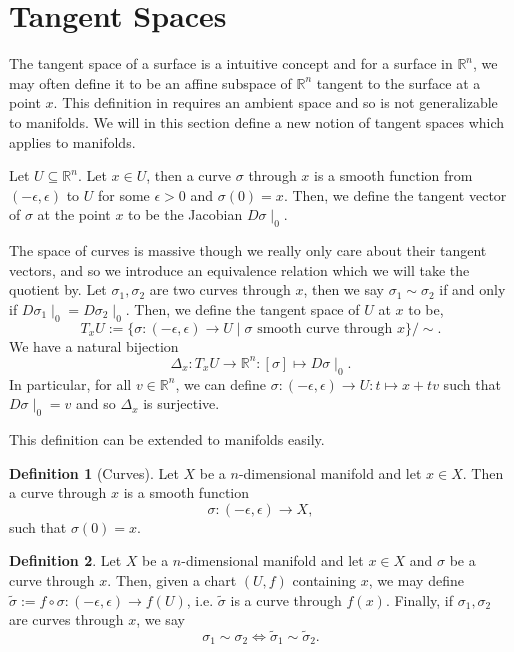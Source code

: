 \documentclass[]{article}
\theoremstyle{definition}
\theoremstyle{definition}
\newtheorem{definition}{Definition}[section]
\begin{document}
\newpage
\section{Tangent Spaces}

The tangent space of a surface is a intuitive concept and for a surface 
in \(\mathbb{R}^n\), we may often define it to be an affine subspace of 
\(\mathbb{R}^n\) tangent to the surface at a point \(x\). This definition in 
requires an ambient space and so is not generalizable to manifolds. We will 
in this section define a new notion of tangent spaces which applies to manifolds.

Let \(U \subseteq \mathbb{R}^n\). Let \(x \in U\), then a curve \(\sigma\) 
through \(x\) is a smooth function from \((-\epsilon, \epsilon)\) to \(U\) 
for some \(\epsilon > 0\) and \(\sigma(0) = x\). Then, we define the tangent 
vector of \(\sigma\) at the point \(x\) to be the Jacobian \(D\sigma\mid_0\).

The space of curves is massive though we really only care about their tangent 
vectors, and so we introduce an equivalence relation which we will take 
the quotient by. Let \(\sigma_1, \sigma_2\) are two curves through \(x\), 
then we say \(\sigma_1 \sim \sigma_2\) if and only if 
\(D\sigma_1\mid_0 = D\sigma_2 \mid_0\). Then, we define the tangent space of 
\(U\) at \(x\) to be, 
\[T_xU := \{\sigma : (-\epsilon, \epsilon) \to U \mid \sigma 
  \text{ smooth curve through } x\} / \sim.\]
We have a natural bijection 
\[\Delta_x : T_xU \to \mathbb{R}^n : [\sigma] \mapsto D\sigma\mid_0.\]
In particular, for all \(v \in \mathbb{R}^n\), we can define 
\(\sigma : (-\epsilon, \epsilon) \to U : t \mapsto x + tv\) such that 
\(D\sigma\mid_0 = v\) and so \(\Delta_x\) is surjective.

This definition can be extended to manifolds easily. 

\begin{definition}[Curves]
  Let \(X\) be a \(n\)-dimensional manifold and let \(x \in X\). Then a 
  curve through \(x\) is a smooth function 
  \[\sigma : (-\epsilon, \epsilon) \to X,\]
  such that \(\sigma(0) = x\).
\end{definition}

\begin{definition}
  Let \(X\) be a \(n\)-dimensional manifold and let \(x \in X\) and 
  \(\sigma\) be a curve through \(x\). Then, given a chart \((U, f)\) 
  containing \(x\), we may define \(\tilde \sigma := f \circ \sigma : 
  (-\epsilon, \epsilon) \to f(U)\), i.e. \(\tilde \sigma\) is a curve through 
  \(f(x)\). Finally, if \(\sigma_1, \sigma_2\) are curves through \(x\), we 
  say 
  \[\sigma_1 \sim \sigma_2 \iff \tilde \sigma_1 \sim \tilde \sigma_2.\]
\end{definition}
\end{document}
